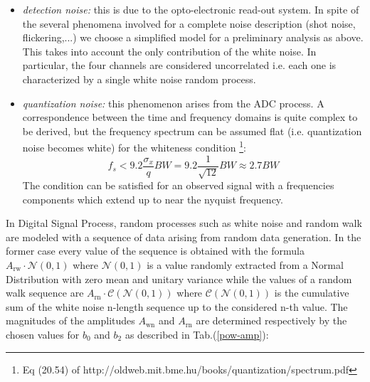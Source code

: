 \documentclass[ fontsize=11pt]{scrartcl} %
\numberwithin{equation}{section} %
\numberwithin{figure}{section} %
\numberwithin{table}{section} %
\begin{document}
\begin{itemize}
\item \textsl{detection noise:} this is due to the opto-electronic read-out system. In spite of the several phenomena involved for a complete noise description (shot noise, flickering,...) we choose a simplified model for a preliminary analysis as above. This takes  into account the only contribution of the white noise. In particular, the four channels are considered uncorrelated i.e. each one is characterized by a single white noise random process. 

\item \textsl{quantization noise:} this phenomenon arises from the ADC process. A correspondence between the time and frequency domains is quite complex to be derived, but the frequency spectrum can be assumed flat (i.e. quantization noise becomes white) for the whiteness condition \footnote{Eq (20.54) of http://oldweb.mit.bme.hu/books/quantization/spectrum.pdf}:
\begin{equation}
f_s<9.2 \frac{\sigma_x}{q}BW=9.2\frac{1}{\sqrt{12}}BW\approx 2.7BW
\end{equation}
The condition can be satisfied for an observed signal with a frequencies components which extend up to near the nyquist frequency.

\end{itemize}

In Digital Signal Process, random processes such as white noise and random walk are modeled with a sequence of data arising from random data generation. In the former case every value of the sequence is obtained with the formula $A_{\text{rw}} \cdot \mathcal{N}(0,1) $ where $\mathcal{N}(0,1) $ is a value randomly extracted from a Normal Distribution with zero mean and unitary variance while the values of a random walk sequence are $A_{\text{rn}} \cdot \mathcal{C}(\mathcal{N}(0,1) )$ where  $\mathcal{C}(\mathcal{N}(0,1) )$ is the cumulative sum of the white noise n-length sequence up to the considered n-th value.
The magnitudes of the amplitudes $A_{\text{wn}}$ and $A_{\text{rn}}$ are determined respectively by the chosen values for $b_0$ and $b_2$ as described in Tab.(\ref{pow-amp}):
\end{document}
